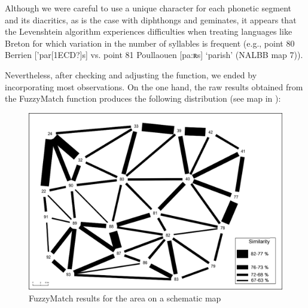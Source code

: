 \documentclass[output=paper]{LSP/langsci}
\begin{document}
\begin{table}
\caption{Examples of the difficulties encountered by DL for the concept 'that one (masc.)'}
\label{tab:3}
\end{table}

Although we were careful to use a unique character for each phonetic segment and its diacritics, as is the case with diphthongs and geminates, it appears that the Levenshtein algorithm experiences difficulties when treating languages like Breton for which variation in the number of syllables is frequent (e.g., point 80 Berrien ['par[1ECD?]s] vs. point 81 Poullaouen [pa:ʀs] ‘parish’ (NALBB map 7)).

Nevertheless, after checking and adjusting the function, we ended by incorporating most observations. On the one hand, the raw results obtained from the FuzzyMatch function produces the following distribution (see map in ):

\begin{figure}
\includegraphics[width=\textwidth]{illustrations/brun_etal_fig3}
\caption{\textup{FuzzyMatch results for the area on a schematic map}}
\label{fig:3}
\end{figure}
\end{document}
